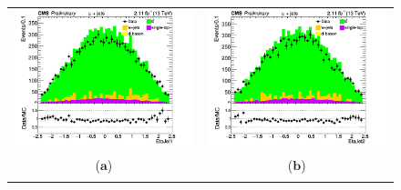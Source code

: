 \documentclass{cmspaper}
\begin{document}
\begin{figure}[htp]
\centering
\begin{tabular}{cc}
\hspace{-0.5cm}
\includegraphics[scale=0.40]{results/EtaJet1.png}
& \hspace{-0.5cm} \includegraphics[scale=0.40]{results/EtaJet2.png}\\
   ($\mathbf{a}$)\qquad\qquad&($\mathbf{b}$)\qquad\qquad\qquad\\
\hspace{-0.5cm}

\end{tabular}
\end{figure}
\end{document}
